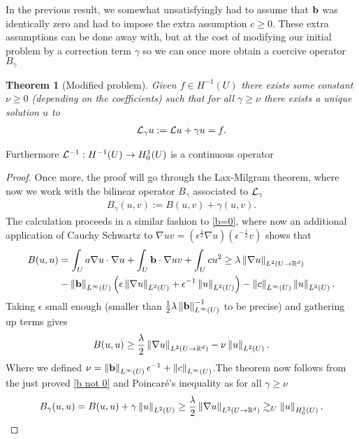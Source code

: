 \documentclass[12pt]{article}
\newtheorem{theorem}{Theorem}[section]
\theoremstyle{definition}
\renewcommand{\norm}[1]{\left\lVert #1 \right\rVert}\renewcommand{\abs}[1]{\left| #1 \right|}
\newcommand{\qt}[1]{\left(#1\right)}
\begin{document}
In the previous result, we somewhat unsatisfyingly had to assume that $ \vb{b}$ was identically zero and had to impose the extra assumption  $c \geq 0$. These extra assumptions can be done away with, but at the cost of modifying our initial problem by a correction term $\gamma $ so we can once more obtain a coercive operator $B_\gamma $
\begin{theorem}[Modified problem]\label{mod}
  Given $f \in  H^{-1}(U)$ there exists some constant $\nu \geq 0$ (depending on the coefficients) such that for all $\gamma \geq \nu$  there exists a unique solution $u$ to
  \begin{align*}
    \mathcal{L}_\gamma u:= \mathcal{L} u+ \gamma u=f.
  \end{align*}
\end{theorem}
Furthermore $\mathcal{L}^{-1}: H^{-1}(U) \to H^1_0(U)$ is a continuous operator
\begin{proof}
  Once more, the proof will go through the Lax-Milgram theorem, where now we work with the bilinear operator $B_\gamma  $ associated to $\mathcal{L}_\gamma  $
  \begin{align*}
    B_\gamma  (u,v):= B(u,v) + \gamma  (u,v).
  \end{align*}
  The calculation proceeds in a similar fashion to  \eqref{b=0}, where now an additional application of Cauchy Schwartz to $\nabla u v = (\epsilon^{\frac{1}{2}} \nabla u)(\epsilon^{-\frac{1}{2}}v)$  shows that
  \begin{align*}
    B(u,u) & = \int_{U}a \nabla u \cdot \nabla u + \int_{U} \vb{b}\cdot  \nabla u v +  \int_{U} cu^2 \geq \lambda \norm{\nabla u}_{L^2(U \to \R^d)}           \\
           & - \norm{\vb{b}}_{L^\infty(U)} \qt{\epsilon \norm{\nabla u}_{L^2(U)}+ \epsilon ^{-1}\norm{u}_{L^2(U)}}- \norm{c}_{L^\infty(U)}\norm{u}_{L^2(U)} .
  \end{align*}
  Taking $\epsilon $ small enough (smaller than $\frac{1}{2} \lambda \norm{\vb{b}}_{L^\infty(U)}^{-1}$ to be precise) and gathering up terms gives
  \begin{align}\label{b not 0}
    B(u,u) \geq \frac{\lambda}{2} \norm{\nabla u}_{L^2(U \to \R^d)} -\nu \norm{u}_{L^2(U)}.
  \end{align}
  Where we defined $\nu = \norm{\vb{b}}_{L^\infty(U)} \epsilon ^{-1}+\norm{c}_{L^\infty(U)}$.The theorem now follows from the just proved \eqref{b not 0} and Poincaré's inequality as for all $\gamma \geq \nu$
  \begin{align*}
    B_\gamma (u,u)=B(u,u)+ \gamma \norm{u}_{L^2(U)} \geq\frac{\lambda}{2} \norm{\nabla u}_{L^2(U \to \R^d)}\gtrsim _U \norm{u}_{H_0^1(U)} .
  \end{align*}
\end{proof}
\end{document}
